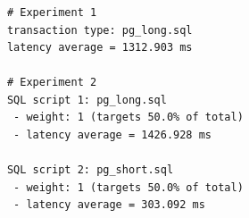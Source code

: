 \documentclass[usenames,dvipsnames, 18pt, compress, aspectratio=169]{beamer}
\begin{document}
\begin{frame}[fragile]{}
    \frametitle{}
    \begin{center}

        \begin{verbatim}
            # Experiment 1
            transaction type: pg_long.sql
            latency average = 1312.903 ms

            # Experiment 2
            SQL script 1: pg_long.sql
             - weight: 1 (targets 50.0% of total)
             - latency average = 1426.928 ms

            SQL script 2: pg_short.sql
             - weight: 1 (targets 50.0% of total)
             - latency average = 303.092 ms
        \end{verbatim}

    \end{center}
\end{frame}
\end{document}
